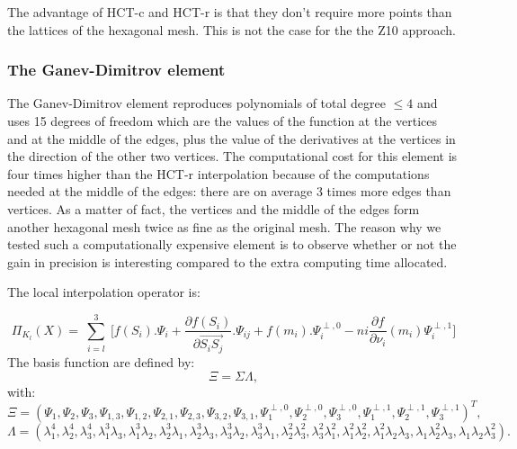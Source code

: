 \documentclass[proc]{edpsmath}
\begin{document}
The advantage of HCT-c and HCT-r is that they don't require more points than the lattices of the hexagonal mesh. This is not the case for the the Z10 approach.

\subsubsection{The Ganev-Dimitrov element}
\label{subsubsec:ganevdimitrov}
The Ganev-Dimitrov element reproduces polynomials of total degree $\le4$ and uses 15 degrees of freedom which are the values of the function at the vertices and at the middle of the edges, plus the value of the derivatives at the vertices in the direction of the other two vertices. 
The computational cost for this element is four times higher than the HCT-r interpolation because of the computations needed at the middle of the edges: there are on average 3 times more edges than vertices. As a matter of fact, the vertices and the middle of the edges form another hexagonal mesh twice as fine as the original mesh. The reason why we tested such a computationally expensive element is to observe whether or not the gain in precision is interesting compared to the extra computing time allocated. 

\noindent The local interpolation operator is:

\begin{equation*}
 \Pi_{K_l} (X) = \sum \limits_{\substack{i=l }}^{3}{ [f(S_i).\Psi_i +  \frac{\partial f(S_i)}{\partial  \overrightarrow{ S_i S_j } }.\Psi_{ij} } + f(m_i).\Psi^{\perp,0}_i  - ni \frac{\partial f}{\partial \nu_i}(m_i) \Psi^{\perp,1}_i] 
\end{equation*}
\noindent The basis function are defined by: 
\begin{equation*}
\Xi =  \Sigma \Lambda,
\end{equation*} 
 \noindent with:\\
\begin{equation*}
\Xi=(\Psi_1, \Psi_2, \Psi_3, \Psi_{1,3},\Psi_{1,2},\Psi_{2,1},\Psi_{2,3} ,\Psi_{3,2},\Psi_{3,1},\Psi_1^{\perp,0} ,\Psi_2^{\perp,0},\Psi_3^{\perp,0},\Psi_1^{\perp,1},\Psi_2^{\perp,1},\Psi_3^{\perp,1})^T,
\end{equation*} 
\begin{equation*}
\Lambda = ( \lambda_1^4,\lambda_2^4,\lambda_3^4,\lambda_1^3\lambda_3,\lambda_1^3\lambda_2,\lambda_2^3\lambda_1,\lambda_2^3\lambda_3 ,\lambda_3^3\lambda_2,\lambda_3^3\lambda_1,\lambda_2^2\lambda_3^2,\lambda_3^2\lambda_1^2,\lambda_1^2\lambda_2^2,\lambda_1^2\lambda_2\lambda_3,\lambda_1\lambda_2^2\lambda_3,\lambda_1\lambda_2\lambda_3^2).
\end{equation*} 
  
\end{document}
